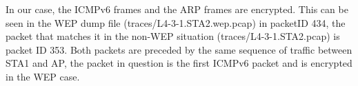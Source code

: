 In our case, the ICMPv6 frames and the ARP frames are encrypted.
This can be seen in the WEP dump file (traces/L4-3-1.STA2.wep.pcap) in packetID 434, the packet that matches it in the non-WEP situation (traces/L4-3-1.STA2.pcap) is packet ID 353.
Both packets are preceded by the same sequence of traffic between STA1 and AP, the packet in question is the first ICMPv6 packet and is encrypted in the WEP case.
